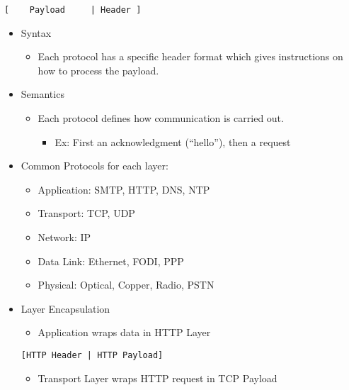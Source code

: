 \documentclass[]{article}
\providecommand{\tightlist}{%
  \setlength{\itemsep}{0pt}\setlength{\parskip}{0pt}}
\begin{document}
\begin{verbatim}
[    Payload     | Header ]
\end{verbatim}

\begin{itemize}
\tightlist
\item
  Syntax

  \begin{itemize}
  \tightlist
  \item
    Each protocol has a specific header format which gives instructions
    on how to process the payload.
  \end{itemize}
\item
  Semantics

  \begin{itemize}
  \tightlist
  \item
    Each protocol defines how communication is carried out.

    \begin{itemize}
    \tightlist
    \item
      Ex: First an acknowledgment (``hello''), then a request
    \end{itemize}
  \end{itemize}
\item
  Common Protocols for each layer:

  \begin{itemize}
  \tightlist
  \item
    Application: SMTP, HTTP, DNS, NTP
  \item
    Transport: TCP, UDP
  \item
    Network: IP
  \item
    Data Link: Ethernet, FODI, PPP
  \item
    Physical: Optical, Copper, Radio, PSTN
  \end{itemize}
\item
  Layer Encapsulation

  \begin{itemize}
  \tightlist
  \item
    Application wraps data in HTTP Layer
  \end{itemize}

\begin{verbatim}
[HTTP Header | HTTP Payload]
\end{verbatim}

  \begin{itemize}
  \tightlist
  \item
    Transport Layer wraps HTTP request in TCP Payload
  \end{itemize}


\end{itemize}
\end{document}

